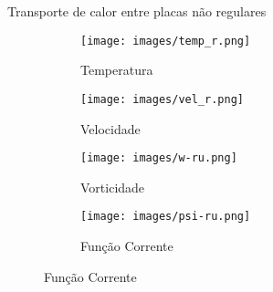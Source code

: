 \documentclass{beamer}
\begin{document}
    
     \begin{frame}{Transporte de calor entre placas não regulares}
        \begin{figure}[H]
  \begin{subfigure}[t]{.6\linewidth}
  	\centering
    \texttt{[image: images/temp\_r.png]}
    \caption{Temperatura}
  \end{subfigure}

  \begin{subfigure}[t]{.6\linewidth}
    \centering  
    \texttt{[image: images/vel\_r.png]}
    \caption{Velocidade}
  \end{subfigure}  
    
  \begin{subfigure}[t]{.6\linewidth}
   \centering
   \texttt{[image: images/w-ru.png]}
    \caption{Vorticidade}
  \end{subfigure}

  \begin{subfigure}[t]{.6\linewidth}
  	\centering
	\texttt{[image: images/psi-ru.png]}
    \caption{Função Corrente}
  \end{subfigure}
	\label{prop}

\end{figure}
    \end{frame}
    
 
\end{document}
